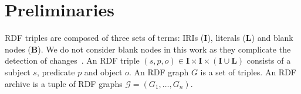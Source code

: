 \documentclass[a4paper]{llncs}
\newcommand{\B}{\ensuremath{\mathbf{B}}\xspace}
\newcommand{\I}{\ensuremath{\mathbf{I}}\xspace}
\renewcommand{\L}{\ensuremath{\mathbf{L}}\xspace}
\begin{document}










\section{Preliminaries}

RDF triples are composed of three sets of terms: IRIs (\I), literals (\L) and blank nodes (\B). We do not consider blank nodes in this work as they complicate the detection of changes~\cite{ZeginisTC11}. An RDF triple $(s,p,o) \in \I \times \I \times (\I \cup \L)$ consists of a subject $s$, predicate $p$ and object $o$. An RDF graph $G$ is a set of triples. An RDF archive is a tuple of RDF graphs $\mathcal{G} = (G_1,\ldots,G_n)$.
\end{document}
